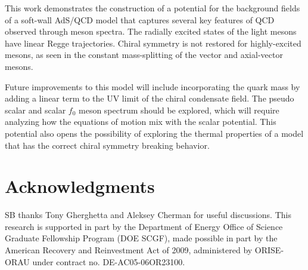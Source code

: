 \documentclass[12pt]{article}
\begin{document}
This work demonstrates the construction of a potential for the background fields of a soft-wall AdS/QCD model that captures several key features of QCD observed through meson spectra.
The radially excited states of the light mesons have linear Regge trajectories.
Chiral symmetry is not restored for highly-excited mesons, as seen in the constant mass-splitting of the vector and axial-vector mesons.

Future improvements to this model will include incorporating the quark mass by adding a linear term to the UV limit of the chiral condensate field.
The pseudo scalar and scalar $f_0$ meson spectrum should be explored, which will require analyzing how the equations of motion mix with the scalar potential.
This potential also opens the possibility of exploring the thermal properties of a model that has the correct chiral symmetry breaking behavior.


\section*{Acknowledgments}
SB thanks Tony Gherghetta and Aleksey Cherman for useful discussions.
This research is supported in part by the Department of Energy Office of Science Graduate Fellowship Program (DOE SCGF), made possible in part by  the American Recovery and Reinvestment Act of 2009, administered by ORISE-ORAU under contract no. DE-AC05-06OR23100.

\vfill



\end{document}
